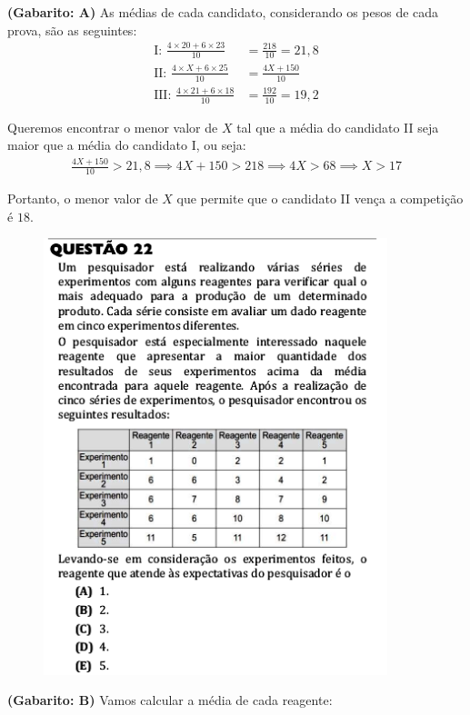 \documentclass[a4paper]{article}
\begin{document}
\par\textbf{(Gabarito: A)} As médias de cada candidato, considerando os pesos de cada prova, são as seguintes:
\begin{align*}
\text{I: }\frac{4\times 20 + 6\times 23}{10} &= \frac{218}{10} = 21,8 \\
\text{II: }\frac{4\times X + 6\times 25}{10} &= \frac{4X + 150}{10} \\
\text{III: }\frac{4\times 21 + 6\times 18}{10} &= \frac{192}{10} = 19,2
\end{align*}
\par\vspace{0.3cm} Queremos encontrar o menor valor de $X$ tal que a média do candidato II seja maior que a média do candidato I, ou seja:
\begin{align*}
\frac{4X + 150}{10} > 21,8 \implies 4X + 150 > 218 \implies 4X > 68 \implies X> 17
\end{align*}
\par\vspace{0.3cm} Portanto, o menor valor de $X$ que permite que o candidato II  vença a competição é $18$.
\begin{figure}[H]
	\begin{center}
		\includegraphics[width=10cm]{L1Q22.png}
	\end{center}
\end{figure}
\par\textbf{(Gabarito: B)} Vamos calcular a média de cada reagente:
\end{document}
